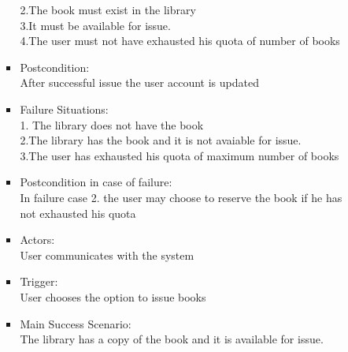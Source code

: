 \documentclass{article}
\begin{document}
\begin{enumerate}
\begin{itemize}
\begin{itemize}
	 2.The book must exist in the library \\
	 3.It must be available for issue.\\
	 4.The user must not have exhausted his quota of number of books\\
 \item Postcondition:\\After successful issue the user account is updated\\
 \item Failure Situations:\\
 1. The library does not have  the book\\ 
 2.The library has the book and it is not avaiable for issue.\\
 3.The user has exhausted his quota of maximum number of books\\
 \item Postcondition in case of failure:\\In failure case 2. the user may choose to reserve the book if he has not exhausted his quota\\
 \item Actors:\\ User communicates with the system\\
 \item Trigger: \\User chooses the option to issue books\\
 \item Main Success Scenario:\\ The library has a copy of the book and it is available for issue.
	\end{itemize}
 


\end{itemize}
\end{enumerate}
\end{document}
